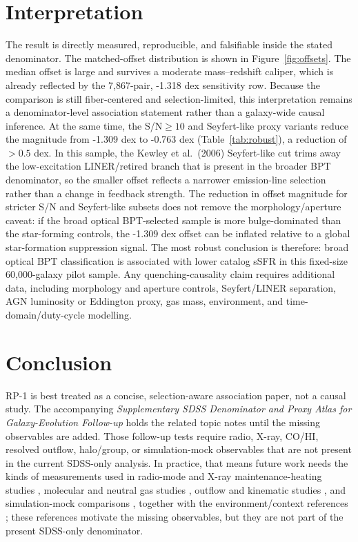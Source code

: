 \documentclass[twocolumn]{aastex631}
\begin{document}
\section{Interpretation}
The result is directly measured, reproducible, and falsifiable inside the stated denominator. The matched-offset distribution is shown in Figure~\ref{fig:offsets}. The median offset is large and survives a moderate mass--redshift caliper, which is already reflected by the 7,867-pair, -1.318 dex sensitivity row.
Because the comparison is still fiber-centered and selection-limited, this interpretation remains a denominator-level association statement rather than a galaxy-wide causal inference. At the same time, the S/N$\geq10$ and Seyfert-like proxy variants reduce the magnitude from -1.309 dex to -0.763 dex (Table~\ref{tab:robust}), a reduction of $>0.5$ dex. In this sample, the Kewley et al.\ (2006) Seyfert-like cut trims away the low-excitation LINER/retired branch that is present in the broader BPT denominator, so the smaller offset reflects a narrower emission-line selection rather than a change in feedback strength. The reduction in offset magnitude for stricter S/N and Seyfert-like subsets does not remove the morphology/aperture caveat: if the broad optical BPT-selected sample is more bulge-dominated than the star-forming controls, the -1.309 dex offset can be inflated relative to a global star-formation suppression signal. The most robust conclusion is therefore: broad optical BPT classification is associated with lower catalog sSFR in this fixed-size 60,000-galaxy pilot sample. Any quenching-causality claim requires additional data, including morphology and aperture controls, Seyfert/LINER separation, AGN luminosity or Eddington proxy, gas mass, environment, and time-domain/duty-cycle modelling.

\section{Conclusion}
RP-1 is best treated as a concise, selection-aware association paper, not a causal study. The accompanying \emph{Supplementary SDSS Denominator and Proxy Atlas for Galaxy-Evolution Follow-up} holds the related topic notes until the missing observables are added. Those follow-up tests require radio, X-ray, CO/HI, resolved outflow, halo/group, or simulation-mock observables that are not present in the current SDSS-only analysis.
In practice, that means future work needs the kinds of measurements used in radio-mode and X-ray maintenance-heating studies \citep{best2005,fabian2012,mcnamara2007,heckmanbest2014,lamassa2013}, molecular and neutral gas studies \citep{xcoldgass2017,xgass2018}, outflow and kinematic studies \citep{veilleux2005,cicone2014,carniani2017,fiore2017}, and simulation-mock comparisons \citep{simba2019,tng2019,eagle2015}, together with the environment/context references \citep{peng2010,piotrowska2022,wetzel2013,dekel2006}; these references motivate the missing observables, but they are not part of the present SDSS-only denominator.
\end{document}
